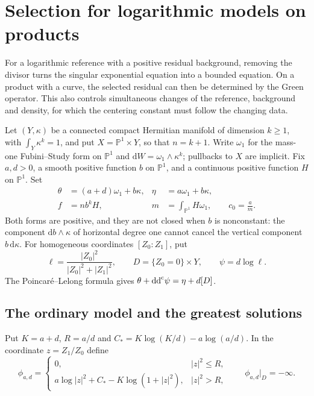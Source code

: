 \section{Selection for logarithmic models on products}
\label{sec:logarithmic-model-selection}

For a logarithmic reference with a positive residual background, removing the divisor turns the singular exponential equation into a bounded equation. On a product with a curve, the selected residual can then be determined by the Green operator. This also controls simultaneous changes of the reference, background and density, for which the centering constant must follow the changing data.

Let $(Y,\kappa)$ be a connected compact Hermitian manifold of dimension $k\geq1$, with $\int_Y\kappa^k=1$, and put $X=\mathbb P^1\times Y$, so that $n=k+1$. Write $\omega_1$ for the mass-one Fubini--Study form on $\mathbb P^1$ and $\mathrm{d}W=\omega_1\wedge\kappa^k$; pullbacks to $X$ are implicit. Fix $a,d>0$, a smooth positive function $b$ on $\mathbb P^1$, and a continuous positive function $H$ on $\mathbb P^1$. Set
\[
 \begin{aligned}
 \theta&=(a+d)\omega_1+b\kappa,&\eta&=a\omega_1+b\kappa,\\
 f&=n b^kH,&m&=\int_{\mathbb P^1}H\omega_1,\qquad c_0=\frac am.
 \end{aligned}
\]
Both forms are positive, and they are not closed when $b$ is nonconstant: the component $\mathrm{d}b\wedge\kappa$ of horizontal degree one cannot cancel the vertical component $b\,\mathrm{d}\kappa$. For homogeneous coordinates $[Z_0:Z_1]$, put
\[
 \ell=\frac{|Z_0|^2}{|Z_0|^2+|Z_1|^2},\qquad
 D=\{Z_0=0\}\times Y,\qquad \psi=d\log\ell.
\]
The Poincar\'e--Lelong formula gives $\theta+\mathrm{dd}^{\mathrm{c}}\psi=\eta+d[D]$.

\subsection{The ordinary model and the greatest solutions}

Put $K=a+d$, $R=a/d$ and $C_*=K\log(K/d)-a\log(a/d)$. In the coordinate $z=Z_1/Z_0$ define
\begin{equation}\label{eq:logarithmic-product-model}
 \phi_{a,d}=\begin{cases}
 0,&|z|^2\leq R,\\
 a\log|z|^2+C_*-K\log(1+|z|^2),&|z|^2>R,
 \end{cases}
 \qquad \phi_{a,d}|_D=-\infty.
\end{equation}

